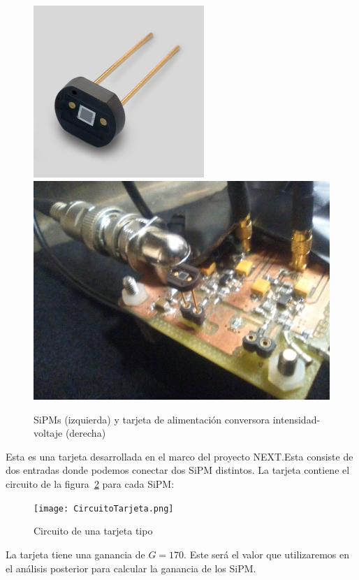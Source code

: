 \begin{enumerate}
\begin{figure}[htb]
\centering
{
\includegraphics[scale=0.55]{SiPM.png} 
}
{
\includegraphics[scale=0.23]{tarjeta.png} 
}
\caption{SiPMs (izquierda) y tarjeta de alimentación conversora intensidad-voltaje (derecha)\label{TarjetaSiPM}}
\end{figure}
Esta es una tarjeta desarrollada en el marco del proyecto NEXT.Esta consiste de dos entradas donde podemos conectar dos SiPM distintos. La tarjeta contiene el circuito  de la figura~\ref{esquemacircuitotarjeta} para cada SiPM:

\begin{figure}[hbtp]
\centering
\texttt{[image: CircuitoTarjeta.png]}
\caption{Circuito de una tarjeta tipo~\cite{datasheet SiPM}\label{esquemacircuitotarjeta}}
\end{figure}
\newpage
La tarjeta tiene una ganancia de $G=170$. Este será el valor que utilizaremos en el análisis posterior para calcular la ganancia de los SiPM.


\end{enumerate}
